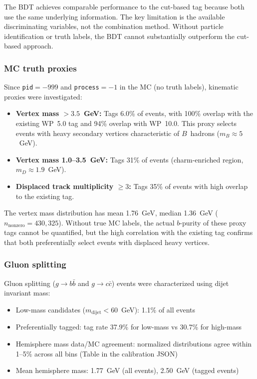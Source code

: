 \documentclass[11pt,a4paper]{article}
\begin{document}
The BDT achieves comparable performance to the cut-based tag because both use the
same underlying information. The key limitation is the available discriminating
variables, not the combination method. Without particle identification or truth
labels, the BDT cannot substantially outperform the cut-based approach.

\subsubsection{MC truth proxies}
\label{sec:postmortem_truth}

Since \texttt{pid}$=-999$ and \texttt{process}$=-1$ in the MC (no truth labels),
kinematic proxies were investigated:

\begin{itemize}
\item \textbf{Vertex mass $> 3.5$~GeV:} Tags 6.0\% of events, with 100\% overlap
  with the existing WP~5.0 tag and 94\% overlap with WP~10.0. This proxy selects
  events with heavy secondary vertices characteristic of $B$~hadrons ($m_B \approx 5$~GeV).
\item \textbf{Vertex mass 1.0--3.5~GeV:} Tags 31\% of events (charm-enriched region,
  $m_D \approx 1.9$~GeV).
\item \textbf{Displaced track multiplicity $\geq 3$:} Tags 35\% of events with high
  overlap to the existing tag.
\end{itemize}

The vertex mass distribution has mean 1.76~GeV, median 1.36~GeV ($n_\mathrm{nonzero} = 430{,}325$).
Without true MC labels, the actual $b$-purity of these proxy tags cannot be
quantified, but the high correlation with the existing tag confirms that both
preferentially select events with displaced heavy vertices.

\subsubsection{Gluon splitting}
\label{sec:postmortem_gsplit}

Gluon splitting ($g \to b\bar{b}$ and $g \to c\bar{c}$) events were characterized
using dijet invariant mass:

\begin{itemize}
\item Low-mass candidates ($m_\mathrm{dijet} < 60$~GeV): 1.1\% of all events
\item Preferentially tagged: tag rate 37.9\% for low-mass vs 30.7\% for high-mass
\item Hemisphere mass data/MC agreement: normalized distributions agree within 1--5\%
  across all bins (Table in the calibration JSON)
\item Mean hemisphere mass: 1.77~GeV (all events), 2.50~GeV (tagged events)
\end{itemize}
\end{document}
